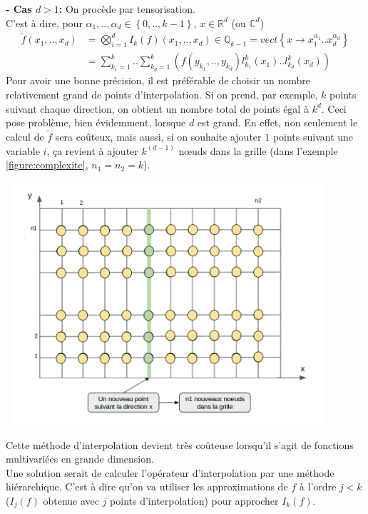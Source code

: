 \vspace{1cm}
\hspace{0.5cm}
\textbf{ - Cas $d>1$: }
On procède par tensorisation. \\
C'est à dire, pour $\alpha_1,..,\alpha_d \in \left \{0,.., k-1 \right \}$, $x \in \mathbb{R}^d$ (ou $\mathbb{C}^d$) \nonumber \\
\begin{align}
   \tilde{f} (x_1,..,x_d)& = \bigotimes_{i=1}^d I_k (f)(x_1,..,x_d) \in \mathbb{Q}_{k-1} = vect \left \{ x \rightarrow x_1^{\alpha_1}..x_d^{\alpha_d} \right \} \nonumber \\
	 & = \sum_{k_1=1}^k..\sum_{k_d=1}^k (f(y_{k_1},..,y_{k_d}) l_{k_1}^k(x_1)..l_{k_d}^k(x_d)) \nonumber
\end{align}
\hspace{0.5cm}
Pour avoir une bonne précision, il est préférable de choisir un nombre relativement grand de points d'interpolation. Si on prend, par exemple, $k$ points suivant chaque direction, on obtient un nombre total de points égal à $k^d$.
Ceci pose problème, bien évidemment, lorsque $d$ est grand. En effet, non seulement le calcul de $\tilde{f}$ sera coûteux, mais aussi, si on souhaite ajouter $1$ points suivant une variable $i$, ça revient à ajouter $k^(d-1)$ nœuds dans la grille (dans l'exemple \ref{figure:complexite}, $n_1=n_2=k$).
\begin{center}
\includegraphics[height=9cm,width=12cm]{images/grille.png}
\label{figure:complexite}
\end{center}
Cette méthode d'interpolation devient très coûteuse lorsqu'il s'agit de fonctions multivariées en grande dimension.\\
Une solution serait de calculer l'opérateur d'interpolation par une méthode hiérarchique. C'est à dire qu'on va utiliser les approximations de $f$ à l'ordre $j<k$ ($I_{j}(f)$ obtenue avec $j$ points d'interpolation) pour approcher $I_{k}(f)$.


